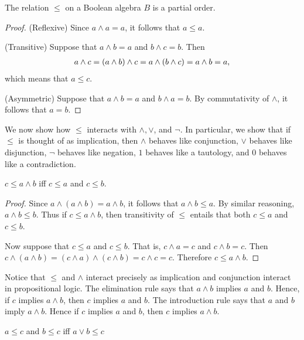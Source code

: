 \begin{prop} The relation $\leq$ on a Boolean algebra $B$ is a partial
  order.
\end{prop} 

\begin{proof} (Reflexive) Since $a\wedge a=a$, it follows that $a\leq
  a$.

(Transitive) Suppose that $a\wedge b=a$ and
$b\wedge c=b$.  Then
\[ \begin{array}{l l} a\wedge c = (a\wedge b)\wedge c = a\wedge
  (b\wedge c)=a\wedge b = a, \end{array} \] which means that $a\leq
c$.

(Asymmetric) Suppose that $a\wedge b=a$ and $b\wedge a=b$.  By
commutativity of $\wedge$, it follows that $a=b$.
\end{proof}

We now show how $\leq$ interacts with $\wedge,\vee$, and $\neg$.  In
particular, we show that if $\leq$ is thought of as implication, then
$\wedge$ behaves like conjunction, $\vee$ behaves like disjunction,
$\neg$ behaves like negation, $1$ behaves like a tautology, and $0$
behaves like a contradiction.

\begin{prop} $c\leq a\wedge b$ iff $c\leq a$ and $c\leq
  b$.  \end{prop}

\begin{proof} Since $a\wedge (a\wedge b)=a\wedge b$, it follows that
  $a\wedge b\leq a$.  By similar reasoning, $a\wedge b\leq b$.  Thus
  if $c\leq a\wedge b$, then transitivity of $\leq$ entails that both
  $c\leq a$ and $c\leq b$.

  Now suppose that $c\leq a$ and $c\leq b$.  That is, $c\wedge a=c$
  and $c\wedge b=c$.  Then $c\wedge (a\wedge b)=(c\wedge a)\wedge
  (c\wedge b)=c\wedge c=c$.  Therefore $c\leq a\wedge b$.  \end{proof}

Notice that $\leq$ and $\wedge$ interact precisely as implication and
conjunction interact in propositional logic.  The elimination rule
says that $a\wedge b$ implies $a$ and $b$.  Hence, if $c$ implies
$a\wedge b$, then $c$ implies $a$ and $b$.  The introduction rule says
that $a$ and $b$ imply $a\wedge b$.  Hence if $c$ implies $a$ and $b$,
then $c$ implies $a\wedge b$.

\begin{prop} $a\leq c$ and $b\leq c$ iff $a\vee b\leq c$ \end{prop}

